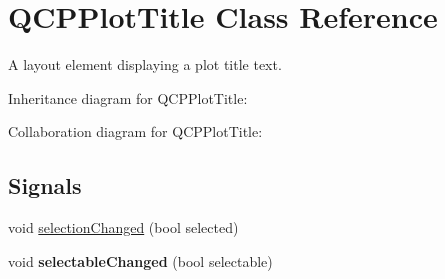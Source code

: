 \hypertarget{classQCPPlotTitle}{}\section{Q\+C\+P\+Plot\+Title Class Reference}
\label{classQCPPlotTitle}


A layout element displaying a plot title text.  




Inheritance diagram for Q\+C\+P\+Plot\+Title\+:


Collaboration diagram for Q\+C\+P\+Plot\+Title\+:
\subsection*{Signals}
\begin{DoxyCompactItemize}
\item 
void \hyperlink{classQCPPlotTitle_a3a01ede2da3b0b5eda33aa5274cc3523}{selection\+Changed} (bool selected)
\item 
void {\bfseries selectable\+Changed} (bool selectable)\hypertarget{classQCPPlotTitle_a5eac3c17a4dbabb75250bc1210a83cfc}{}\label{classQCPPlotTitle_a5eac3c17a4dbabb75250bc1210a83cfc}

\end{DoxyCompactItemize}
